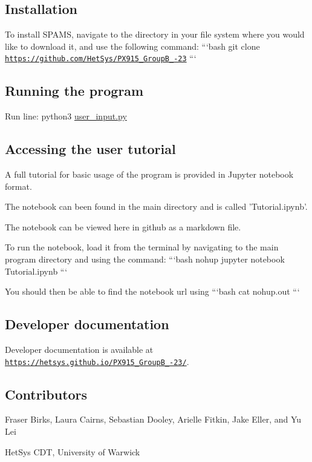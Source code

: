 \subsection*{Installation}

To install S\-P\-A\-M\-S, navigate to the directory in your file system where you would like to download it, and use the following command\-: ```bash git clone \href{https://github.com/HetSys/PX915_GroupB_22-23}{\tt https\-://github.\-com/\-Het\-Sys/\-P\-X915\-\_\-\-Group\-B\-\_-\/23} ```

\subsection*{Running the program}

Run line\-: {\ttfamily python3 \hyperlink{user__input_8py}{user\-\_\-input.\-py}}

\subsection*{Accessing the user tutorial}

A full tutorial for basic usage of the program is provided in Jupyter notebook format.
\begin{DoxyItemize}
\item The notebook can been found in the main directory and is called 'Tutorial.\-ipynb'.
\item The notebook can be viewed here in github as a markdown file.
\item To run the notebook, load it from the terminal by navigating to the main program directory and using the command\-: ```bash nohup jupyter notebook Tutorial.\-ipynb ```
\item You should then be able to find the notebook url using ```bash cat nohup.\-out ```
\end{DoxyItemize}

\subsection*{Developer documentation}

Developer documentation is available at \href{https://hetsys.github.io/PX915_GroupB_22-23/}{\tt https\-://hetsys.\-github.\-io/\-P\-X915\-\_\-\-Group\-B\-\_-\/23/}.



\subsection*{Contributors}

Fraser Birks, Laura Cairns, Sebastian Dooley, Arielle Fitkin, Jake Eller, and Yu Lei

Het\-Sys C\-D\-T, University of Warwick 